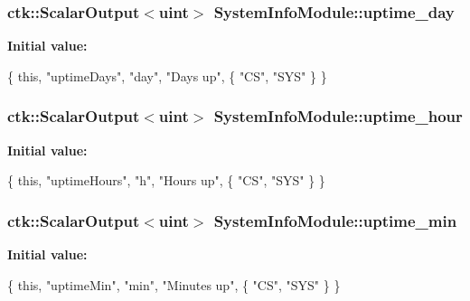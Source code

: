\subsubsection[{\texorpdfstring{uptime\+\_\+day}{uptime_day}}]{\setlength{\rightskip}{0pt plus 5cm}ctk\+::\+Scalar\+Output$<$uint$>$ System\+Info\+Module\+::uptime\+\_\+day}\hypertarget{classSystemInfoModule_aff0df5601842fc6a159b6d3b41d432e7}{}\label{classSystemInfoModule_aff0df5601842fc6a159b6d3b41d432e7}
{\bfseries Initial value\+:}
\begin{DoxyCode}
\{ \textcolor{keyword}{this}, \textcolor{stringliteral}{"uptimeDays"}, \textcolor{stringliteral}{"day"}, \textcolor{stringliteral}{"Days up"},
    \{ \textcolor{stringliteral}{"CS"}, \textcolor{stringliteral}{"SYS"} \} \}
\end{DoxyCode}
\subsubsection[{\texorpdfstring{uptime\+\_\+hour}{uptime_hour}}]{\setlength{\rightskip}{0pt plus 5cm}ctk\+::\+Scalar\+Output$<$uint$>$ System\+Info\+Module\+::uptime\+\_\+hour}\hypertarget{classSystemInfoModule_a3d47028791032c6902961f06a8fce2ea}{}\label{classSystemInfoModule_a3d47028791032c6902961f06a8fce2ea}
{\bfseries Initial value\+:}
\begin{DoxyCode}
\{ \textcolor{keyword}{this}, \textcolor{stringliteral}{"uptimeHours"}, \textcolor{stringliteral}{"h"}, \textcolor{stringliteral}{"Hours up"},
    \{ \textcolor{stringliteral}{"CS"}, \textcolor{stringliteral}{"SYS"} \} \}
\end{DoxyCode}
\subsubsection[{\texorpdfstring{uptime\+\_\+min}{uptime_min}}]{\setlength{\rightskip}{0pt plus 5cm}ctk\+::\+Scalar\+Output$<$uint$>$ System\+Info\+Module\+::uptime\+\_\+min}\hypertarget{classSystemInfoModule_ac9d5e9bb6272a88e010bdbd75c122ed0}{}\label{classSystemInfoModule_ac9d5e9bb6272a88e010bdbd75c122ed0}
{\bfseries Initial value\+:}
\begin{DoxyCode}
\{ \textcolor{keyword}{this}, \textcolor{stringliteral}{"uptimeMin"}, \textcolor{stringliteral}{"min"}, \textcolor{stringliteral}{"Minutes up"},
    \{ \textcolor{stringliteral}{"CS"}, \textcolor{stringliteral}{"SYS"} \} \}
\end{DoxyCode}
